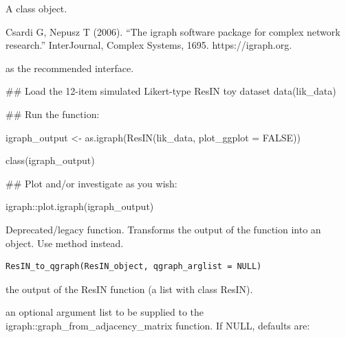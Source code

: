 \documentclass[a4paper]{book}
\begin{document}
%
\begin{Value}
A class  object.
\end{Value}
%
\begin{References}
Csardi G, Nepusz T (2006). “The igraph software package for complex network research.” InterJournal, Complex Systems, 1695. https://igraph.org.
\end{References}
%
\begin{SeeAlso}
 as the recommended interface.
\end{SeeAlso}
%
\begin{Examples}
\begin{ExampleCode}

## Load the 12-item simulated Likert-type ResIN toy dataset
data(lik_data)

## Run the function:

igraph_output <-  as.igraph(ResIN(lik_data, plot_ggplot = FALSE))

class(igraph_output)

## Plot and/or investigate as you wish:

igraph::plot.igraph(igraph_output)



\end{ExampleCode}
\end{Examples}
%
\begin{Description}
Deprecated/legacy function. Transforms the output of the  function into an  object. Use  method instead.
\end{Description}
%
\begin{Usage}
\begin{verbatim}
ResIN_to_qgraph(ResIN_object, qgraph_arglist = NULL)
\end{verbatim}
\end{Usage}
%
\begin{Arguments}
\begin{ldescription}
\item[\code{ResIN\_object}] the output of the ResIN function (a list with class ResIN).

\item[\code{qgraph\_arglist}] an optional argument list to be supplied to the igraph::graph\_from\_adjacency\_matrix function. If NULL, defaults are: 
\end{ldescription}
\end{Arguments}
\end{document}
